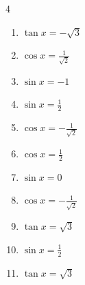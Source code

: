 \begin{multicols}{4}
\begin{enumerate}
  \item $\displaystyle \tan{x}  = -\sqrt{3}$


  \item $\displaystyle \cos{x}  = \frac{1}{\sqrt{2}}$


  \item $\displaystyle \sin{x}  = -1$


  \item $\displaystyle \sin{x}  = \frac{1}{2}$


  \item $\displaystyle \cos{x}  = -\frac{1}{\sqrt{2}}$


  \item $\displaystyle \cos{x}  = \frac{1}{2}$


  \item $\displaystyle \sin{x}  = 0$


  \item $\displaystyle \cos{x}  = -\frac{1}{\sqrt{2}}$


  \item $\displaystyle \tan{x}  = \sqrt{3}$


\columnbreak %

\resetques

  \item $\displaystyle \sin{x}  = \frac{1}{2}$


  \item $\displaystyle \tan{x}  = \sqrt{3}$



\end{enumerate}
\end{multicols}

